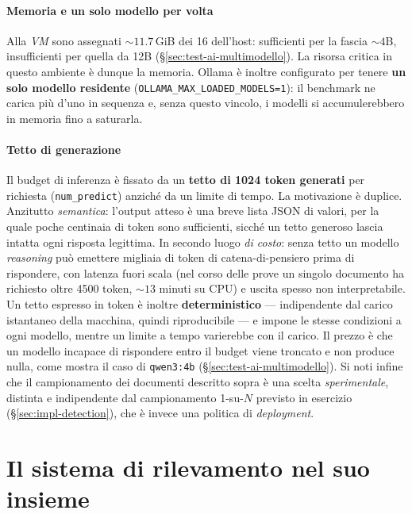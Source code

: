 \paragraph*{Memoria e un solo modello per volta} Alla \textit{VM} sono assegnati ${\sim}11.7$\,GiB dei 16 dell'host: sufficienti per la fascia ${\sim}4$B, insufficienti per quella da 12B (§\ref{sec:test-ai-multimodello}). La risorsa critica in questo ambiente è dunque la memoria. Ollama è inoltre configurato per tenere \textbf{un solo modello residente} (\texttt{OLLAMA\_MAX\_LOADED\_MODELS=1}): il benchmark ne carica più d'uno in sequenza e, senza questo vincolo, i modelli si accumulerebbero in memoria fino a saturarla.

\paragraph*{Tetto di generazione} Il budget di inferenza è fissato da un \textbf{tetto di 1024 token generati} per richiesta (\texttt{num\_predict}) anziché da un limite di tempo. La motivazione è duplice. Anzitutto \emph{semantica}: l'output atteso è una breve lista JSON di valori, per la quale poche centinaia di token sono sufficienti, sicché un tetto generoso lascia intatta ogni risposta legittima. In secondo luogo \emph{di costo}: senza tetto un modello \textit{reasoning} può emettere migliaia di token di catena-di-pensiero prima di rispondere, con latenza fuori scala (nel corso delle prove un singolo documento ha richiesto oltre 4500 token, ${\sim}13$ minuti su CPU) e uscita spesso non interpretabile. Un tetto espresso in token è inoltre \textbf{deterministico} --- indipendente dal carico istantaneo della macchina, quindi riproducibile --- e impone le stesse condizioni a ogni modello, mentre un limite a tempo varierebbe con il carico. Il prezzo è che un modello incapace di rispondere entro il budget viene troncato e non produce nulla, come mostra il caso di \texttt{qwen3:4b} (§\ref{sec:test-ai-multimodello}). Si noti infine che il campionamento dei documenti descritto sopra è una scelta \emph{sperimentale}, distinta e indipendente dal campionamento 1-su-$N$ previsto in esercizio (§\ref{sec:impl-detection}), che è invece una politica di \emph{deployment}.

\section{Il sistema di rilevamento nel suo insieme}
\label{sec:test-detection}

